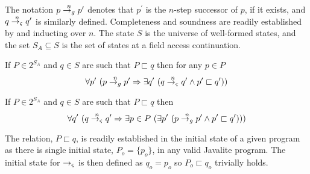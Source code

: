 The notation $p \stackrel{n}{\rightarrow_{g}} p^\prime$ denotes that $p^\prime$
is the $n$-step successor of $p$, if it exists, and $q
\stackrel{n}{\rightarrow_{\varsigma}} q^\prime$ is similarly defined. Completeness and
soundness are readily established by  and inducting
over $n$. The state $S$ is the universe of well-formed states, and the
set $S_A \subseteq S$ is the set of states at a field access continuation.

\begin{corollary}
If $P \in 2^{S_\mathit{A}}$ and $q \in S$ are such that $P \sqsubset q$ then for any $p \in P$
$$
\forall p^\prime\ (p \stackrel{n}{\rightarrow_{g}} p^\prime \Rightarrow \exists q^\prime\ (q \stackrel{n}{\rightarrow_{\varsigma}} q^\prime \wedge p^\prime \sqsubset q^\prime))
$$
\end{corollary}

\begin{corollary}
If $P \in 2^{S_\mathit{A}}$ and $q \in S$ are such that $P \sqsubset q$ then
$$
\forall q^\prime\ (q \stackrel{n}{\rightarrow_{\varsigma}} q^\prime \Rightarrow \exists p \in P\ (\exists p^\prime\ (p \stackrel{n}{\rightarrow_{g}} p^\prime \wedge p^\prime \sqsubset q^\prime)))
$$
\end{corollary}

The relation, $P \sqsubset q$, is readily established in the initial
state of a given program as there is single initial state, $P_o =
\{p_o\}$, in any valid Javalite program. The initial state for $\rightarrow_{\varsigma}$ is
then defined as $q_o = p_o$ so $P_o \sqsubset q_o$ trivially holds.
